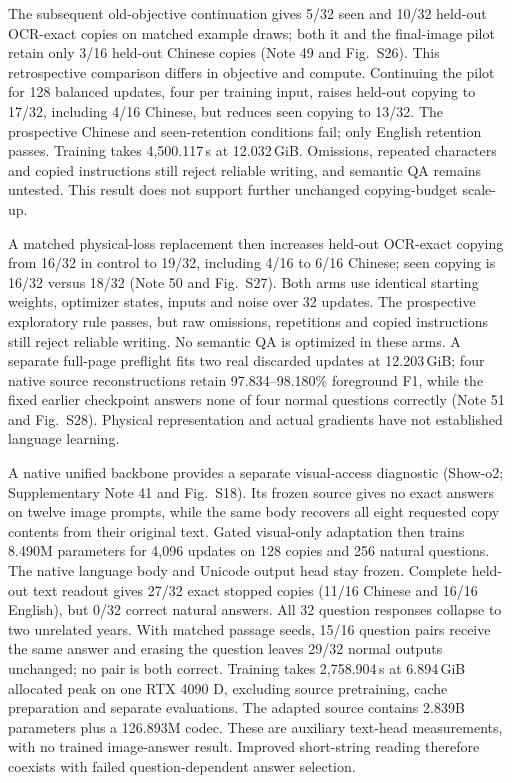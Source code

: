 \documentclass[12pt,a4paper]{article}
\begin{document}
The subsequent old-objective continuation gives 5/32 seen and 10/32 held-out
OCR-exact copies on matched example draws; both it and the final-image pilot
retain only 3/16 held-out Chinese copies (Note 49 and Fig.~S26). This
retrospective comparison differs in objective and compute. Continuing the
pilot for 128 balanced updates, four per training input, raises held-out
copying to 17/32, including 4/16 Chinese, but reduces seen copying to 13/32.
The prospective Chinese and seen-retention conditions fail; only English
retention passes. Training takes 4,500.117\,s at 12.032\,GiB. Omissions,
repeated characters and copied instructions still reject reliable writing, and
semantic QA remains untested. This result does not support further unchanged
copying-budget scale-up.

A matched physical-loss replacement then increases held-out OCR-exact copying
from 16/32 in control to 19/32, including 4/16 to 6/16 Chinese; seen copying
is 16/32 versus 18/32 (Note 50 and Fig.~S27). Both arms use identical starting
weights, optimizer states, inputs and noise over 32 updates. The prospective
exploratory rule passes, but raw omissions, repetitions and copied instructions
still reject reliable writing. No semantic QA is optimized in these arms.
A separate full-page preflight fits two real discarded updates at
12.203\,GiB; four native source reconstructions retain 97.834--98.180\%
foreground F1, while the fixed earlier checkpoint answers none of four normal
questions correctly (Note 51 and Fig.~S28). Physical representation and actual
gradients have not established language learning.

A native unified backbone provides a separate visual-access diagnostic
(Show-o2\cite{showo2}; Supplementary Note 41 and Fig.~S18). Its frozen source
gives no exact answers on twelve image prompts, while the same body recovers
all eight requested copy contents from their original text. Gated visual-only
adaptation then trains 8.490M parameters for 4,096 updates on 128 copies and
256 natural questions. The native language body and Unicode output head stay
frozen. Complete held-out text readout gives 27/32 exact stopped copies
(11/16 Chinese and 16/16 English), but 0/32 correct natural answers. All
32 question responses collapse to two unrelated years. With matched passage
seeds, 15/16 question pairs receive the same answer and erasing the question
leaves 29/32 normal outputs unchanged; no pair is both correct. Training takes
2,758.904\,s at 6.894\,GiB allocated peak on one RTX 4090 D, excluding source
pretraining, cache preparation and separate evaluations. The adapted source
contains 2.839B parameters plus a 126.893M codec. These are auxiliary text-head
measurements, with no trained image-answer result. Improved short-string
reading therefore coexists with failed question-dependent answer selection.
\end{document}
